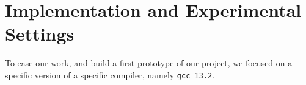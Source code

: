 \documentclass[acmsmall,review, nonacm]{acmart}
\begin{document}
\section{Implementation and Experimental Settings}
To ease our work, and build a first prototype of our project, we focused on a specific version of a specific compiler, namely \texttt{gcc 13.2}.













\end{document}
